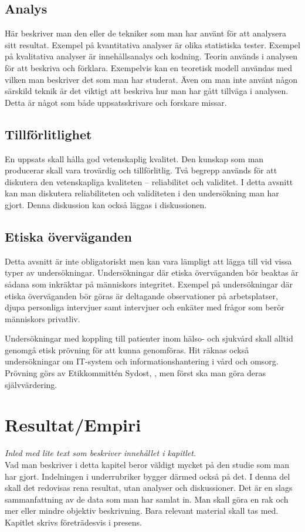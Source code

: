\documentclass[a4paper,12pt]{article} %
\begin{document}
			
\subsection{Analys}
Här beskriver man den eller de tekniker som man har använt för att analysera sitt resultat. Exempel på kvantitativa analyser är olika statistiska tester. Exempel på kvalitativa analyser är innehållsanalys och kodning. Teorin används i analysen för att beskriva och förklara. Exempelvis kan en teoretisk modell användas med vilken man beskriver det som man har studerat. Även om man inte använt någon särskild teknik är det viktigt att beskriva hur man har gått tillväga i analysen. Detta är något som både uppsatsskrivare och forskare missar. 


\subsection{Tillförlitlighet}
En uppsats skall hålla god vetenskaplig kvalitet. Den kunskap som man producerar skall vara trovärdig och tillförlitlig. Två begrepp används för att diskutera den vetenskapliga kvaliteten – reliabilitet och validitet. I detta avsnitt kan man diskutera reliabiliteten och validiteten i den undersökning man har gjort. Denna diskussion kan också läggas i diskussionen. 


\subsection{Etiska överväganden}
Detta avsnitt är inte obligatoriskt men kan vara lämpligt att lägga till vid vissa typer av undersökningar. Undersökningar där etiska överväganden bör beaktas är sådana som inkräktar på människors integritet. Exempel på undersökningar där etiska överväganden bör göras är deltagande observationer på arbetsplatser, djupa personliga intervjuer samt intervjuer och enkäter med frågor som berör människors privatliv. 

Undersökningar med koppling till patienter inom hälso- och sjukvård skall alltid genomgå etisk prövning för att kunna genomföras. Hit räknas också undersökningar om IT-system och informationshantering i vård och omsorg. Prövning görs av Etikkommittén Sydost, \cite{etik}, men först ska man göra deras självvärdering. 
 


\newpage

\section{Resultat/Empiri}
\emph{Inled med lite text som beskriver innehållet i kapitlet.}\\
Vad man beskriver i detta kapitel beror väldigt mycket på den studie som man har gjort. Indelningen i underrubriker bygger därmed också på det. I denna del skall det redovisas rena resultat, utan analyser och diskussioner. Det är en slags sammanfattning av de data som man har samlat in. Man skall göra en rak och mer eller mindre objektiv beskrivning. Bara relevant material skall tas med. Kapitlet skrivs företrädesvis i presens. 
		
\end{document}
